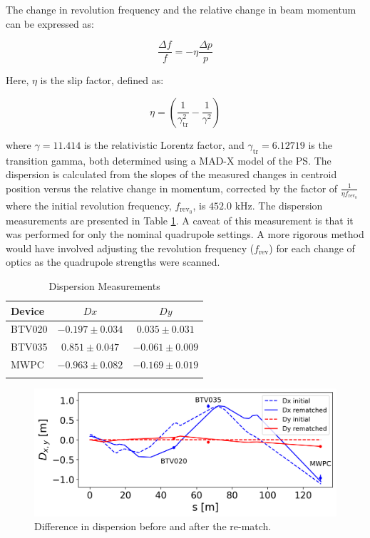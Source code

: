 \documentclass[a4paper,
               biblatex,     %
               ]{jacow}
\begin{document}
The change in revolution frequency and the relative change in beam momentum can be expressed as:

\begin{equation}
\frac{\Delta f}{f} = -\eta \frac{\Delta p}{p}
\end{equation}

Here, $\eta$ is the slip factor, defined as:

\begin{equation}
\eta = \left(\frac{1}{\gamma_{\text{tr}}^{2}} - \frac{1}{\gamma^{2}}\right)
\end{equation}

\noindent where $\gamma = 11.414$ is the relativistic Lorentz factor, and $\gamma_{\text{tr}} = 6.12719$ is the transition gamma, both determined using a MAD-X \cite{noauthor_mad_nodate} model of the PS. The dispersion is calculated from the slopes of the measured changes in centroid position versus the relative change in momentum, corrected by the factor of $\frac{1}{\eta f_{\text{rev}_0}}$ where the initial revolution frequency, $f_{\text{rev}_0}$, is $452.0$ kHz. The dispersion measurements are presented in Table \ref{tab:dispersion}. A caveat of this measurement is that it was performed for only the nominal quadrupole settings. A more rigorous method would have involved adjusting the revolution frequency ($f_{\text{rev}}$) for each change of optics as the quadrupole strengths were scanned.

\begin{table}[h!]
\centering
\caption{Dispersion Measurements}
\begin{tabular}{l c c}
\hline
Device & \(Dx\) & \(Dy\) \\
\hline
BTV020  & \(-0.197 \pm 0.034\) & \(0.035 \pm 0.031\) \\
BTV035  & \(0.851 \pm 0.047\) & \(-0.061 \pm 0.009\) \\
MWPC   & \(-0.963 \pm 0.082\) & \(-0.169 \pm 0.019\) \\
\hline
\label{tab:dispersion}
\end{tabular}
\end{table}

\begin{figure}[!htb]
   \centering
   \includegraphics*[width=1.0\columnwidth]{THPR032_f1.png}
   \caption{Difference in dispersion before and after the re-match.}
   \label{fig:dispersion}
\end{figure}
\end{document}

